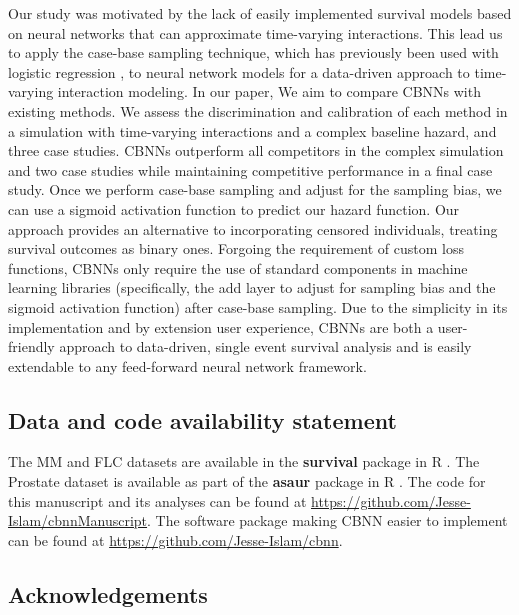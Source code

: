 \documentclass[preprint,12pt,authoryear]{elsarticle}
\begin{document}
Our study was motivated by the lack of easily implemented survival models based on neural networks that can approximate time-varying interactions.
This lead us to apply the case-base sampling technique, which has previously been used with logistic regression \citep{hanley2009}, to neural network models for a data-driven
approach to time-varying interaction modeling. In our paper, We aim to compare CBNNs with existing methods. We assess the discrimination and calibration
of each method in a simulation with time-varying interactions and a complex baseline hazard, and three case studies. CBNNs outperform all competitors in
the complex simulation and two case studies while maintaining competitive performance in a final case study. Once we perform case-base sampling and
adjust for the sampling bias, we can use a sigmoid activation function to predict our hazard function. Our approach provides an alternative to incorporating
censored individuals, treating survival outcomes as binary ones. Forgoing the requirement of custom loss functions, CBNNs only require the use of standard
components in machine learning libraries (specifically, the add layer to adjust for sampling bias and the sigmoid activation function) after case-base sampling.
Due to the simplicity in its implementation and by extension user experience, CBNNs are both a user-friendly approach to data-driven, single event survival analysis and is
easily extendable to any feed-forward neural network framework.


\hypertarget{data-and-code-availability-statement}{%
\subsection*{Data and code availability
statement}\label{data-and-code-availability-statement}}


The MM and FLC datasets are available in the \textbf{survival} package in R
\citep{survpkg}. The Prostate dataset is available as part of the \textbf{asaur} package in R \citep{asaur}.
The code for this manuscript and its analyses can be found at \url{https://github.com/Jesse-Islam/cbnnManuscript}. The software package making CBNN
easier to implement can be found at \url{https://github.com/Jesse-Islam/cbnn}.

\hypertarget{acknowledgements}{%
\subsection*{Acknowledgements}\label{acknowledgements}}
\end{document}
